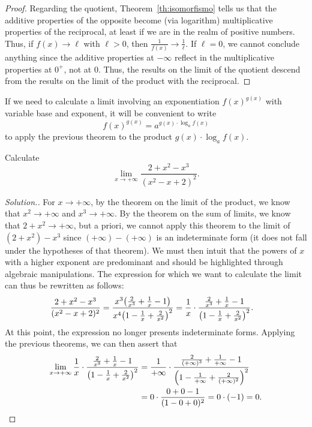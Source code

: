 \begin{proof}
Regarding the quotient, Theorem~\ref{th:isomorfismo}
tells us that the additive properties of the opposite become (via logarithm)
multiplicative properties of the reciprocal, at least if we are in the realm of
positive numbers.
Thus, if $f(x)\to \ell$ with $\ell>0$, 
then $\frac{1}{f(x)} \to \frac{1}{\ell}$.
If $\ell=0$, we cannot conclude anything since the additive properties 
at $-\infty$ reflect in the multiplicative properties 
at $0^+$, not at $0$. 
Thus, the results on the limit of the quotient descend from the results 
on the limit of the product with the reciprocal.
\end{proof}


If we need to calculate a limit involving an exponentiation 
$f(x)^{g(x)}$ with variable base and exponent, it will be convenient 
to write
\[
 f(x)^{g(x)} = a^{g(x)\cdot \log_a f(x)}
\]
to apply the previous theorem to the product $g(x)\cdot \log_a f(x)$.

\begin{example}
  Calculate
  \[
  \lim_{x\to +\infty} \frac{2+x^2-x^3}{(x^2-x+2)^2}.
  \]
  \end{example}
  \begin{proof}[Solution.]
  For $x\to +\infty$, by the theorem on the limit of
  the product, we know that $x^2\to +\infty$ and
  $x^3\to +\infty$.
  By the theorem on the sum of limits,
  we know that $2+x^2\to +\infty$, but
  a priori, we cannot apply this theorem
  to the limit of $(2+x^2)-x^3$ since
  $(+\infty)-(+\infty)$ is an indeterminate form
  (it does not fall under the hypotheses of that theorem).
  We must then intuit that the powers of $x$
  with a higher exponent are predominant and should
  be highlighted through
  algebraic manipulations. The expression
  for which we want to calculate the limit
  can thus be rewritten as follows:
  \begin{align*}
  \frac{2+x^2-x^3}{(x^2-x+2)^2}
    &= \frac{x^3 {\left( \frac 2 {x^3}+\frac{1}{x}-1 \right)}}{x^4{\left( 1-\frac 1 x
  + \frac{2}{x^2} \right)}^2}
    = \frac{1}{x}\cdot \frac{\frac 2 {x^3}+\frac{1}{x}-1}{{\left( 1-\frac 1 x +
  \frac{2}{x^2} \right)}^2}.
  \end{align*}
  At this point, the expression no longer presents indeterminate forms.
  Applying the previous theorems, we can then assert that
  \begin{align*}
  \lim_{x\to+\infty}\frac{1}{x}\cdot \frac{\frac 2 {x^3}+\frac{1}{x}-1}{{\left( 1-\frac 1 x + \frac{2}{x^2} \right)}^2}
    &= \frac{1}{+\infty} \cdot \frac{\frac 2
  {(+\infty)^3}+\frac{1}{+\infty}-1}{{\left( 1-\frac 1 {+\infty} +
  \frac{2}{(+\infty)^2} \right)}^2}\\
  &= 0 \cdot \frac{0+0-1}{(1-0+0)^2} = 0\cdot (-1) = 0.
  \end{align*}
\end{proof}

